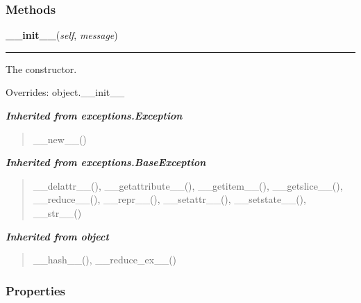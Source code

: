 
  \subsubsection{Methods}

    \vspace{0.5ex}

\hspace{.8\funcindent}\begin{boxedminipage}{\funcwidth}

    \raggedright \textbf{\_\_init\_\_}(\textit{self}, \textit{message})

    \vspace{-1.5ex}

    \rule{\textwidth}{0.5\fboxrule}
\setlength{\parskip}{2ex}
    The constructor.

\setlength{\parskip}{1ex}
      Overrides: object.\_\_init\_\_

    \end{boxedminipage}


\large{\textbf{\textit{Inherited from exceptions.Exception}}}

\begin{quote}
\_\_new\_\_()
\end{quote}

\large{\textbf{\textit{Inherited from exceptions.BaseException}}}

\begin{quote}
\_\_delattr\_\_(), \_\_getattribute\_\_(), \_\_getitem\_\_(), \_\_getslice\_\_(), \_\_reduce\_\_(), \_\_repr\_\_(), \_\_setattr\_\_(), \_\_setstate\_\_(), \_\_str\_\_()
\end{quote}

\large{\textbf{\textit{Inherited from object}}}

\begin{quote}
\_\_hash\_\_(), \_\_reduce\_ex\_\_()
\end{quote}


  \subsubsection{Properties}

